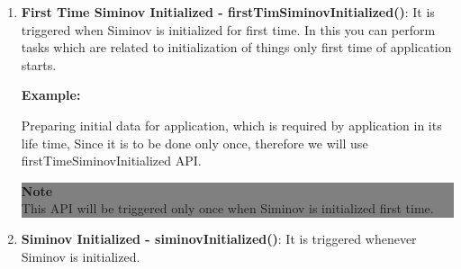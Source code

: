 		\begin{enumerate}

			\item \small \textbf{First Time Siminov Initialized - firstTimSiminovInitialized()}: It is triggered when Siminov is initialized for first time. In this you can perform tasks which are related to initialization of things only first time of application starts.

					\par
					\textbf{Example:}
	
					\par
					 Preparing initial data for application, which is required by application in its life time, Since it is to be done only once, therefore we will use firstTimeSiminovInitialized API.
						
		
			
					\begin{center}
						\colorbox{grey}{
						\parbox[t]{.8\linewidth}{
							\fontsize{11pt}{11pt}\selectfont %
							\vspace*{0.1cm} %
		
							\hfill \textbf{Note} \\
							This API will be triggered only once when Siminov is initialized first time.
				
							\vspace*{0.0cm} %
						}
					}

					\end{center}


			\item \small \textbf{Siminov Initialized - siminovInitialized()}: It is triggered whenever Siminov is initialized. 

					\begin{center}
						\colorbox{grey}{
						\parbox[t]{.8\linewidth}{
							\fontsize{11pt}{11pt}\selectfont %
							\vspace*{0.1cm} %
		
}}
\end{center}
\end{enumerate}
